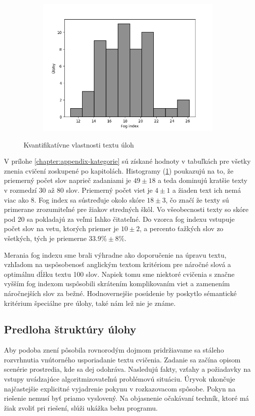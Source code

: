 \begin{figure}[h]
\begin{subfigure}[b]{0.32\textwidth}
\includegraphics[width=\textwidth]{assets/fog.png}
\end{subfigure}
\hfill
\caption{Kvantifikatívne vlastnosti textu úloh}
\label{fig:text-metrics}
\end{figure}

V prílohe \ref{chapter:appendix-kategorie} sú získané hodnoty v tabuľkách pre všetky znenia cvičení zoskupené po kapitolách. Histogramy (\ref{fig:text-metrics}) poukazujú na to, že priemerný počet slov naprieč zadaniami je $49 \pm 18$ a teda dominujú kratšie texty v rozmedzí $30$ až $80$ slov. Priemerný počet viet je $4 \pm 1$ a žiaden text ich nemá viac ako $8$. Fog index sa sústreďuje okolo skóre $18 \pm 3$, čo značí že texty sú primerane zrozumiteľné pre žiakov stredných škôl. Vo všeobecnosti texty so skóre pod 20 sa pokladajú za veľmi ľahko čitateľné. Do vzorca fog indexu vstupuje počet slov na vetu, ktorých priemer je $10 \pm 2$, a percento ťažkých slov zo všetkých, tých je priemerne $33.9\% \pm 8\%$.

Merania fog indexu sme brali výhradne ako doporučenie na úpravu textu, vzhľadom na uspôsobenosť anglickým textom kritériom pre náročné slová a optimálnu dĺžku textu 100 slov. Napiek tomu sme niektoré cvičenia s značne vyšším fog indexom uspôsobili skrátením komplikovaním viet a zamenením náročnejších slov za bežné. Hodnovernejšie posúdenie by poskytlo sémantické kritérium špeciálne pre úlohy, také nám lež nie je známe. 

\subsection{Predloha štruktúry úlohy}
Aby podoba znení pôsobila rovnorodým dojmom pridržiavame sa stáleho rozvrhnutia vnútorného usporiadanie textu cvičenia. Zadanie sa začína opisom scenérie prostredia, kde sa dej odohráva. Nasledujú fakty, vzťahy a požiadavky na vstupy uvádzajúce algoritmizovateľnú problémovú situáciu. Úryvok ukončuje najčastejšie explicitné vyjadrenie pokynu v rozkazovacom spôsobe. Pokyn na riešenie nemusí byť priamo vyslovený. Na objasnenie očakávaní techník, ktoré má žiak zvoliť pri riešení, slúži ukážka behu programu. 

